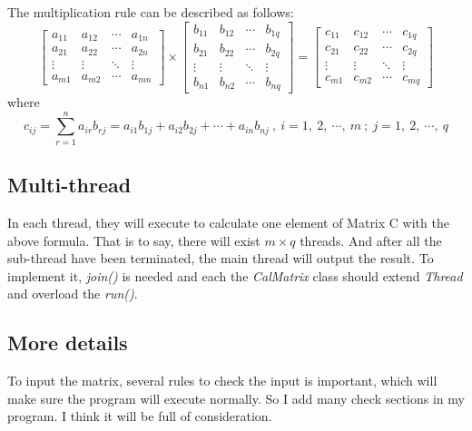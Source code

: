 \documentclass{article}
\begin{document}
The multiplication rule can be described as follows:
\begin{equation}
\left[
  \begin{array}{cccc}
    a_{11} & a_{12} & \cdots & a_{1n}\\
    a_{21} & a_{22} & \cdots & a_{2n}\\
    \vdots & \vdots & \ddots & \vdots\\
    a_{m1} & a_{m2} & \cdots & a_{mn}
  \end{array}
\right]
\times
\left[
  \begin{array}{cccc}
    b_{11} & b_{12} & \cdots & b_{1q}\\
    b_{21} & b_{22} & \cdots & b_{2q}\\
    \vdots & \vdots & \ddots & \vdots\\
    b_{n1} & b_{n2} & \cdots & b_{nq}
  \end{array}
\right]
=
\left[
  \begin{array}{cccc}
    c_{11} & c_{12} & \cdots & c_{1q}\\
    c_{21} & c_{22} & \cdots & c_{2q}\\
    \vdots & \vdots & \ddots & \vdots\\
    c_{m1} & c_{m2} & \cdots & c_{mq}
  \end{array}
\right]
\end{equation}
where
\begin{equation}
c_{ij} = \sum_{r=1}^{n} a_{ir}b_{rj} = a_{i1}b_{1j} + a_{i2}b_{2j} + \cdots + a_{in}b_{nj}\ ,\ i=1,\ 2,\ \cdots,\ m\ ;\ j=1,\ 2,\ \cdots,\ q
\end{equation}
\subsection{Multi-thread}
In each thread, they will execute to calculate one element of Matrix C with the above formula. That is to say, there will exist $m\times q$ threads. And after all the sub-thread have been terminated, the main thread will output the result. To implement it, \emph{join()} is needed and each the \emph{CalMatrix} class should extend \emph{Thread} and overload the \emph{run()}.
\subsection{More details}
To input the matrix, several rules to check the input is important, which will make sure the program will execute normally. So I add many check sections in my program. I think it will be full of consideration.
\end{document}
